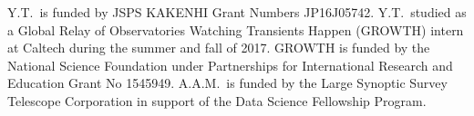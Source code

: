 \documentclass[twocolumn, dvipdfmx]{aastex62}
\begin{document}
Y.T.\ is funded by JSPS KAKENHI Grant Numbers JP16J05742. Y.T.\ studied as a
Global Relay of Observatories Watching Transients Happen (GROWTH) intern at
Caltech during the summer and fall of 2017. GROWTH is funded by the National
Science Foundation under Partnerships for International Research and
Education Grant No 1545949. A.A.M.\ is funded by the Large Synoptic Survey
Telescope Corporation in support of the Data Science Fellowship Program.








\end{document}
